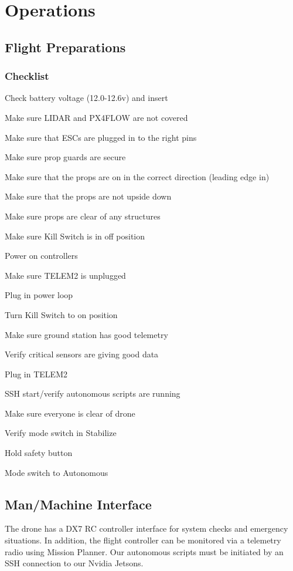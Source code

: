 \documentclass[12pt,letterpaper]{article}
\newenvironment{my_enumerate}{
	\begin{enumerate}
	\setlength{\itemsep}{1pt}
	\setlength{\parskip}{0pt}
	\setlength{\parsep}{0pt}}{\end{enumerate}
}
\begin{document}
\section*{Operations}
	\subsection*{Flight Preparations}
		\subsubsection*{Checklist}
			\begin{my_enumerate}
				\item Check battery voltage (12.0-12.6v) and insert
				\item Make sure LIDAR and PX4FLOW are not covered
				\item Make sure that ESCs are plugged in to the right pins
				\item Make sure prop guards are secure
				\item Make sure that the props are on in the correct direction (leading edge in)
				\item Make sure that the props are not upside down
				\item Make sure props are clear of any structures
				\item Make sure Kill Switch is in off position
				\item Power on controllers
				\item Make sure TELEM2 is unplugged
				\item Plug in power loop
				\item Turn Kill Switch to on position
				\item Make sure ground station has good telemetry
				\item Verify critical sensors are giving good data
				\item Plug in TELEM2
				\item SSH start/verify autonomous scripts are running
				\item Make sure everyone is clear of drone
				\item Verify mode switch in Stabilize
				\item Hold safety button
				\item Mode switch to Autonomous
			\end{my_enumerate}
	\subsection*{Man/Machine Interface}
		The drone has a DX7 RC controller interface for system checks and emergency situations. In addition, the flight controller can be monitored via a telemetry radio using Mission Planner. Our autonomous scripts must be initiated by an SSH connection to our Nvidia Jetsons.
\end{document}
